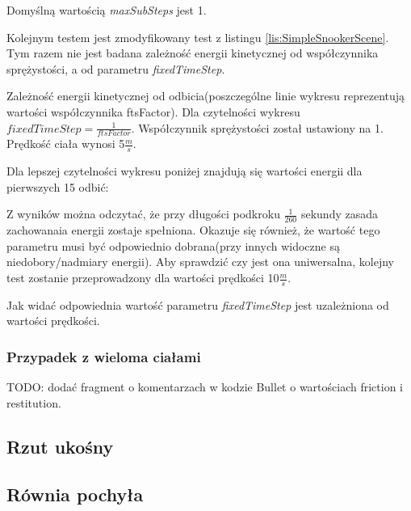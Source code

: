 Domyślną wartością \emph{maxSubSteps} jest 1.

Kolejnym testem jest zmodyfikowany test z listingu \ref{lis:SimpleSnookerScene}.
Tym razem nie jest badana zależność energii kinetycznej od współczynnika
sprężystości, a od parametru \emph{fixedTimeStep}. 



Zależność energii kinetycznej od odbicia(poszczególne linie wykresu
reprezentują wartości współczynnika ftsFactor). Dla czytelności wykresu $
fixedTimeStep = \frac{1}{ftsFactor} $. Współczynnik sprężystości został
ustawiony na 1. Prędkość ciała wynosi 5$\frac{m}{s}$.



Dla lepszej czytelności wykresu poniżej znajdują się wartości energii dla
pierwszych 15 odbić:



Z wyników można odczytać, że przy długości podkroku $ \frac{1}{260} $ sekundy
zasada zachowanaia energii zostaje spełniona. Okazuje się również, że wartość
tego parametru musi być odpowiednio dobrana(przy innych widoczne są
niedobory/nadmiary energii). Aby sprawdzić czy jest ona uniwersalna, kolejny
test zostanie przeprowadzony dla wartości prędkości 10$\frac{m}{s}$.



Jak widać odpowiednia wartość parametru \emph{fixedTimeStep} jest uzależniona od
wartości prędkości.

\subsubsection{Przypadek z wieloma ciałami}

TODO: dodać fragment o komentarzach w kodzie Bullet o wartościach friction i
restitution.

\subsection{Rzut ukośny}

\subsection{Równia pochyła}

